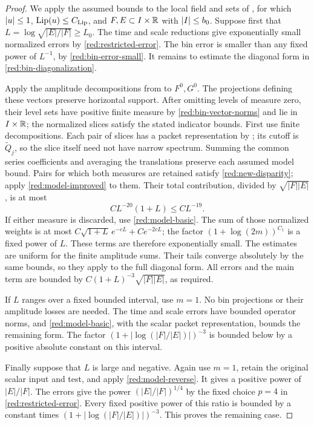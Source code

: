 \begin{proof}
We apply the assumed bounds to the local field and sets of
, for which \(\left|u\right|\le1\),
\(\operatorname{Lip}(u)\le C_{\rm Lip}\), and \(F,E\subset I\times\mathbb R\) with
\(\left|I\right|\le b_0\).
Suppose first that \(L=\log\sqrt{|E|/|F|}\ge L_0\).
The time and scale reductions give exponentially small normalized
errors by \eqref{red:restricted-error}. The bin error is smaller
than any fixed power of \(L^{-1}\), by
\eqref{red:bin-error-small}. It remains to estimate the diagonal
form in \eqref{red:bin-diagonalization}.

Apply the amplitude decompositions from  to
\(F^0,G^0\). The projections defining these vectors preserve horizontal
support. After omitting levels of measure zero, their level sets have
positive finite measure by \eqref{red:bin-vector-norms} and lie in
\(I\times\mathbb R\); the normalized slices satisfy the stated indicator
bounds. First use finite decompositions. Each pair of slices
has a packet representation by ;
its cutoff is \(\widetilde Q_j\), so the slice itself need not
have narrow spectrum. Summing the common series coefficients and
averaging the translations preserve each assumed model bound.
Pairs for which both measures are retained satisfy
\eqref{red:new-disparity}; apply \eqref{red:model-improved} to
them. Their total contribution, divided by
\(\sqrt{|F||E|}\), is at most
\[
 C L^{-20}(1+L)\le C L^{-19}.
\]
If either measure is discarded, use \eqref{red:model-basic}.
The sum of those normalized weights is at most
\(C\sqrt{1+L}\,e^{-cL}+Ce^{-2cL}\); the factor
\((1+\log(2m))^{C_1}\) is a fixed power of \(L\).
These terms are therefore exponentially small. The estimates are
uniform for the finite amplitude sums. Their tails converge
absolutely by the same bounds, so they apply to the full diagonal
form. All errors and the main term are bounded by
\(C(1+L)^{-3}\sqrt{|F||E|}\), as required.

If \(L\) ranges over a fixed bounded interval, use \(m=1\).
No bin projections or their amplitude losses are needed. The time
and scale errors have bounded operator norms, and
\eqref{red:model-basic}, with the scalar packet representation,
bounds the remaining form. The factor
\((1+|\log(|F|/|E|)|)^{-3}\) is bounded below by a positive
absolute constant on this interval.

Finally suppose that \(L\) is large and negative. Again use
\(m=1\), retain the original scalar input and test, and apply
\eqref{red:model-reverse}. It gives a positive power of
\(|E|/|F|\). The errors give the power \((|E|/|F|)^{1/4}\)
by the fixed choice \(p=4\) in
\eqref{red:restricted-error}. Every fixed positive power of this
ratio is bounded by a constant times
\((1+|\log(|F|/|E|)|)^{-3}\). This proves the remaining case.


\end{proof}
